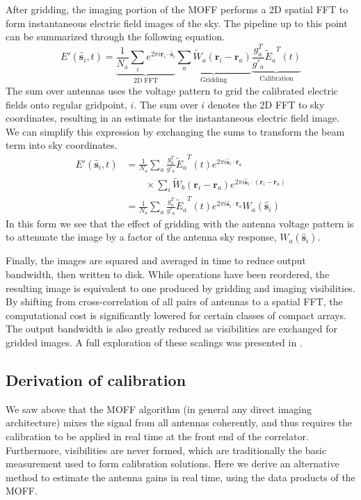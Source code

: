 \documentclass[a4paper,fleqn,usenatbib]{../mnras}
\newcommand{\Nant}{\ensuremath{N_{\mathrm{a}}}}
\newcommand{\s}{\ensuremath{\hat{\mathbf{s}}}} %
\newcommand{\ri}{\ensuremath{\mathbf{r}_i}}
\newcommand{\ra}{\ensuremath{\mathbf{r}_a}}
\newcommand{\beamr}{\ensuremath{\widetilde{W}}}
\newcommand{\beamtheta}{\ensuremath{W}}
\newcommand{\Er}[1]{\ensuremath{\widetilde{E}_{#1}}}
\newcommand{\Ethetaest}{\ensuremath{E'}}
\begin{document}
After gridding, the imaging portion of the MOFF performs a 2D spatial FFT to form instantaneous electric field images of the sky. The pipeline up to this point can be summarized through the following equation.
\begin{equation}
\Ethetaest (\s_i,t) = \underbrace{\frac{1}{\Nant} \sum_i e^{2\pi i \ri \cdot \s_i}}_{\mathrm{2D\;FFT}} 
\underbrace{\sum_a \beamr_a(\ri - \ra)}_{\mathrm{Gridding}}
\underbrace{ \frac{g^T_a}{g'_a} \Er{a}^T(t)}_{\mathrm{Calibration}}
\end{equation}
The sum over antennas uses the voltage pattern to grid the calibrated electric fields onto regular gridpoint, $i$. The sum over $i$ denotes the 2D FFT to sky coordinates, resulting in an estimate for the instantaneous electric field image. We can simplify this expression by exchanging the sums to transform the beam term into sky coordinates.
\begin{align}\label{eq:epix}
\Ethetaest(\s_i,t) & = \frac{1}{\Nant} \sum_a \frac{g^T_a}{g'_a}\Er{a}^T(t) e^{2\pi i \s_i \cdot \ra} \nonumber \\
  & \qquad\times \sum_i \beamr_b(\ri-\ra)e^{2\pi i \s_i \cdot (\ri-\ra)} \nonumber\\
& = \frac{1}{\Nant} \sum_a \frac{ g^T_a}{g'_a}\Er{a}^T(t) e^{2\pi i \s_i \cdot \ra}\beamtheta_a(\s_i)
\end{align}
In this form we see that the effect of gridding with the antenna voltage pattern is to attenuate the image by a factor of the antenna sky response, $\beamtheta_a(\s_i)$.

Finally, the images are squared and averaged in time to reduce output bandwidth, then written to disk. While operations have been reordered, the resulting image is equivalent to one produced by gridding and imaging visibilities. By shifting from cross-correlation of all pairs of antennas to a spatial FFT, the computational cost is significantly lowered for certain classes of compact arrays. The output bandwidth is also greatly reduced as visibilities are exchanged for gridded images. A full exploration of these scalings was presented in \citealt{thy15c}.

\subsection{Derivation of calibration}
We saw above that the MOFF algorithm (in general any direct imaging architecture) mixes the signal from all antennas coherently, and thus requires the calibration to be applied in real time at the front end of the correlator. Furthermore, visibilities are never formed, which are traditionally the basic measurement used to form calibration solutions. Here we derive an alternative method to estimate the antenna gains in real time, using the data products of the MOFF. 
\end{document}
